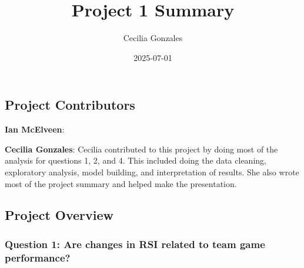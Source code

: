 \documentclass[
]{article}
\title{Project 1 Summary}
\author{Cecilia Gonzales}
\date{2025-07-01}
\begin{document}
\maketitle

\subsection{Project Contributors}\label{project-contributors}

\textbf{Ian McElveen}:

\textbf{Cecilia Gonzales}: Cecilia contributed to this project by doing
most of the analysis for questions 1, 2, and 4. This included doing the
data cleaning, exploratory analysis, model building, and interpretation
of results. She also wrote most of the project summary and helped make
the presentation.

\subsection{Project Overview}\label{project-overview}

\subsubsection{Question 1: Are changes in RSI related to team game
performance?}\label{question-1-are-changes-in-rsi-related-to-team-game-performance}
\end{document}
